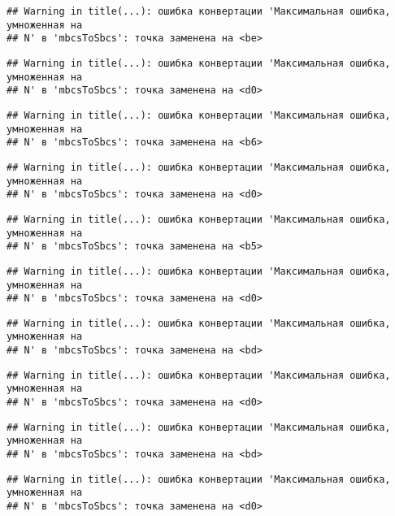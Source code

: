 \documentclass[
]{article}
\begin{document}
\begin{verbatim}
## Warning in title(...): ошибка конвертации 'Максимальная ошибка, умноженная на
## N' в 'mbcsToSbcs': точка заменена на <be>
\end{verbatim}

\begin{verbatim}
## Warning in title(...): ошибка конвертации 'Максимальная ошибка, умноженная на
## N' в 'mbcsToSbcs': точка заменена на <d0>
\end{verbatim}

\begin{verbatim}
## Warning in title(...): ошибка конвертации 'Максимальная ошибка, умноженная на
## N' в 'mbcsToSbcs': точка заменена на <b6>
\end{verbatim}

\begin{verbatim}
## Warning in title(...): ошибка конвертации 'Максимальная ошибка, умноженная на
## N' в 'mbcsToSbcs': точка заменена на <d0>
\end{verbatim}

\begin{verbatim}
## Warning in title(...): ошибка конвертации 'Максимальная ошибка, умноженная на
## N' в 'mbcsToSbcs': точка заменена на <b5>
\end{verbatim}

\begin{verbatim}
## Warning in title(...): ошибка конвертации 'Максимальная ошибка, умноженная на
## N' в 'mbcsToSbcs': точка заменена на <d0>
\end{verbatim}

\begin{verbatim}
## Warning in title(...): ошибка конвертации 'Максимальная ошибка, умноженная на
## N' в 'mbcsToSbcs': точка заменена на <bd>
\end{verbatim}

\begin{verbatim}
## Warning in title(...): ошибка конвертации 'Максимальная ошибка, умноженная на
## N' в 'mbcsToSbcs': точка заменена на <d0>
\end{verbatim}

\begin{verbatim}
## Warning in title(...): ошибка конвертации 'Максимальная ошибка, умноженная на
## N' в 'mbcsToSbcs': точка заменена на <bd>
\end{verbatim}

\begin{verbatim}
## Warning in title(...): ошибка конвертации 'Максимальная ошибка, умноженная на
## N' в 'mbcsToSbcs': точка заменена на <d0>
\end{verbatim}
\end{document}
